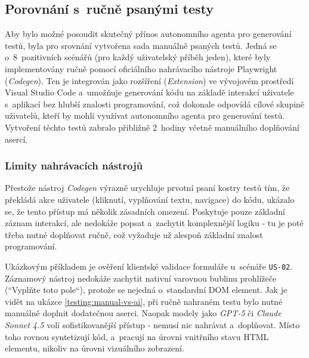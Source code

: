 \documentclass[czech, ing, kiv, he, iso690numb, viewonly]{fasthesis}
\begin{document}
\subsection{Porovnání s~ručně psanými testy}
Aby bylo možné posoudit skutečný přínos autonomního agenta pro generování testů,
byla pro srovnání vytvořena sada manuálně psaných testů.
Jedná se o~8~pozitivních scénářů (pro každý uživatelský příběh jeden), 
které byly implementovány ručně pomocí oficiálního nahrávacího nástroje Playwright (\textit{Codegen}).
Ten je integrován jako rozšíření (\textit{Extension}) ve vývojovém prostředí Visual Studio Code 
a~umožňuje generování kódu na základě interakcí uživatele s~aplikací bez hlubší znalosti programování, což
dokonale odpovídá cílové skupině uživatelů, kteří by mohli využívat autonomního agenta pro generování testů.
Vytvoření těchto testů zabralo přibližně 2~hodiny včetně manuálního doplňování asercí.

\subsubsection*{Limity nahrávacích nástrojů}
Přestože nástroj \textit{Codegen} výrazně urychluje prvotní psaní kostry testů tím, 
že překládá akce uživatele (kliknutí, vyplňování textu, navigace) do kódu,
ukázalo se, že tento přístup má několik zásadních omezení.
Poskytuje pouze základní záznam interakcí, ale nedokáže popsat a~zachytit komplexnější logiku 
- tu je poté třeba nutné doplňovat ručně, což vyžaduje už alespoň základní znalost programování.

Ukázkovým příkladem je ověření klientské validace formuláře u~scénáře \texttt{US-02}.
Záznamový nástroj nedokáže zachytit nativní varovnou bublinu prohlížeče (``Vyplňte toto pole``), 
protože se nejedná o~standardní DOM element. Jak je vidět na ukázce \ref{testing:manual-vs-ai}, 
při ručně nahraném testu bylo nutné manuálně doplnit dodatečnou aserci.
Naopak modely jako \textit{GPT-5} či \textit{Claude Sonnet 4.5} 
volí sofistikovanější přístup - nemusí nic nahrávat a~doplňovat. Místo toho rovnou 
syntetizují kód, a~pracují na úrovni vnitřního stavu HTML elementu, nikoliv na úrovni vizuálního zobrazení.
\end{document}
